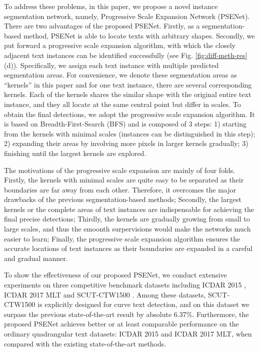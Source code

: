 \documentclass{article}
\begin{document}
To address these problems, in this paper, we propose a novel instance segmentation network, namely, Progressive Scale Expansion Network (PSENet). There are two advantages of the proposed PSENet. Firstly, as a segmentation-based method, PSENet is able to locate texts with arbitrary shapes. Secondly, we put forward a progressive scale expansion algorithm, with which the closely adjacent text instances can be identified successfully (see Fig. \ref{fig:diff-meth-res} (d)). Specifically, we assign each text instance with multiple predicted segmentation areas. For convenience, we denote these segmentation areas as ``kernels'' in this paper and for one text instance, there are several corresponding kernels. Each of the kernels shares the similar shape with the original entire text instance, and they all locate at the same central point but differ in scales. To obtain the final detections, we adopt the progressive scale expansion algorithm. It is based on Breadth-First-Search (BFS) and is composed of 3 steps: 1) starting from the kernels with minimal scales (instances can be distinguished in this step); 2) expanding their areas by involving more pixels in larger kernels gradually; 3) finishing until the largest kernels are explored.

The motivations of the progressive scale expansion are mainly of four folds. Firstly, the kernels with minimal scales are quite easy to be separated as their boundaries are far away from each other. Therefore, it overcomes the major drawbacks of the previous segmentation-based methods; Secondly, the largest kernels or the complete areas of text instances are indispensable for achieving the final precise detections; Thirdly, the kernels are gradually growing from small to large scales, and thus the smoonth surpervisions would make the networks much easier to learn; Finally, the progressive scale expansion algorithm ensures the accurate locations of text instances as their boundaries are expanded in a careful and gradual manner. 











To show the effectiveness of our proposed PSENet, we conduct extensive experiments on three competitive benchmark datasets including ICDAR 2015 \cite{karatzas2015icdar}, ICDAR 2017 MLT \cite{icdar2017mlt} and SCUT-CTW1500 \cite{Liu2017Detecting}. 
Among these datasets, SCUT-CTW1500 is explicitly designed for curve text detection, and on this dataset we surpass the previous state-of-the-art result by absolute 6.37\%.
Furthermore, the proposed PSENet achieves better or at least comparable performance on the ordinary quadrangular text datasets: ICDAR 2015 and ICDAR 2017 MLT, when compared with the existing state-of-the-art methods. 
\end{document}
